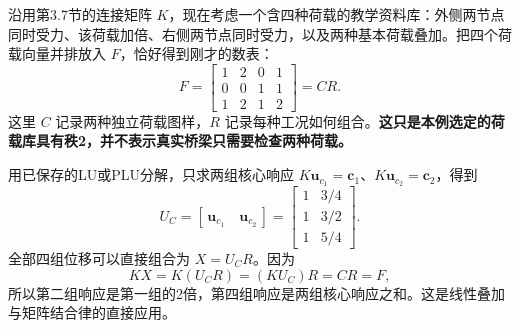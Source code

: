 \documentclass[a4paper,12pt,twoside,openany,fontset=none]{ctexbook}
\numberwithin{equation}{chapter}
\begin{document}
沿用第3.7节的连接矩阵 $K$，现在考虑一个含四种荷载的教学资料库：外侧两节点同时受力、该荷载加倍、右侧两节点同时受力，以及两种基本荷载叠加。把四个荷载向量并排放入 $F$，恰好得到刚才的数表：
\[
 F=\begin{bmatrix}1&2&0&1\\0&0&1&1\\1&2&1&2\end{bmatrix}=CR.
\]
这里 $C$ 记录两种独立荷载图样，$R$ 记录每种工况如何组合。\textbf{这只是本例选定的荷载库具有秩2，并不表示真实桥梁只需要检查两种荷载。}

用已保存的LU或PLU分解，只求两组核心响应 $K\boldsymbol u_{c_1}=\boldsymbol c_1$、$K\boldsymbol u_{c_2}=\boldsymbol c_2$，得到
\[
 U_C=[\,\boldsymbol u_{c_1}\quad\boldsymbol u_{c_2}\,]
 =\begin{bmatrix}1&3/4\\1&3/2\\1&5/4\end{bmatrix}.
\]
全部四组位移可以直接组合为 $X=U_CR$。因为
\[
 KX=K(U_CR)=(KU_C)R=CR=F,
\]
所以第二组响应是第一组的2倍，第四组响应是两组核心响应之和。这是线性叠加与矩阵结合律的直接应用。
\end{document}

